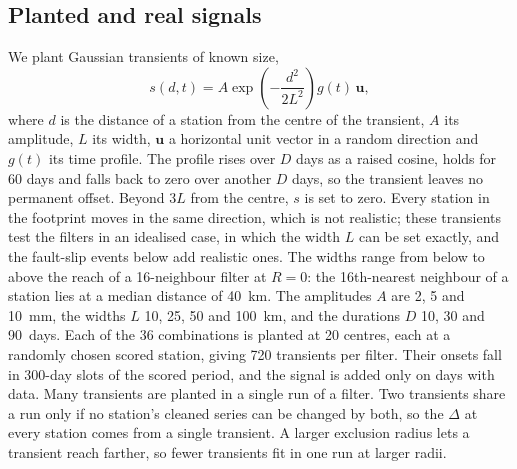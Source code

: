 \documentclass[preprint,12pt,authoryear]{elsarticle}
\begin{document}
\subsection{Planted and real signals}
\label{sec:planted}

We plant Gaussian transients of known size,
\begin{equation}
  s(d, t) = A \exp\!\left(-\frac{d^2}{2L^2}\right) g(t)\, \mathbf{u},
  \label{eq:gaussian}
\end{equation}
where $d$ is the distance of a station from the centre of the transient, $A$ its amplitude, $L$ its width, $\mathbf{u}$ a horizontal unit vector in a random direction and $g(t)$ its time profile. The profile rises over $D$ days as a raised cosine, holds for 60 days and falls back to zero over another $D$ days, so the transient leaves no permanent offset. Beyond $3L$ from the centre, $s$ is set to zero. Every station in the footprint moves in the same direction, which is not realistic; these transients test the filters in an idealised case, in which the width $L$ can be set exactly, and the fault-slip events below add realistic ones. The widths range from below to above the reach of a 16-neighbour filter at $R = 0$: the 16th-nearest neighbour of a station lies at a median distance of 40~km. The amplitudes $A$ are 2, 5 and 10~mm, the widths $L$ 10, 25, 50 and 100~km, and the durations $D$ 10, 30 and 90~days. Each of the 36 combinations is planted at 20 centres, each at a randomly chosen scored station, giving 720 transients per filter. Their onsets fall in 300-day slots of the scored period, and the signal is added only on days with data. Many transients are planted in a single run of a filter. Two transients share a run only if no station's cleaned series can be changed by both, so the $\Delta$ at every station comes from a single transient. A larger exclusion radius lets a transient reach farther, so fewer transients fit in one run at larger radii.
\end{document}

